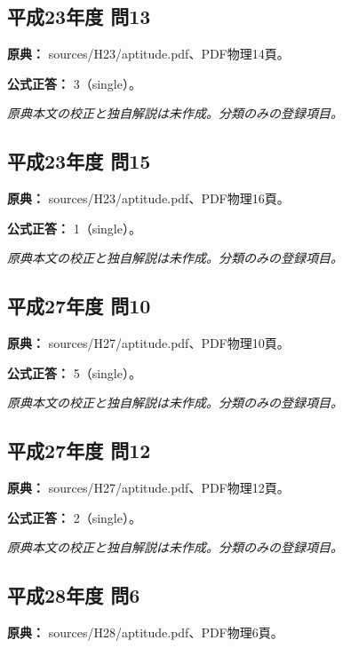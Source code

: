 \subsection{平成23年度 問13}
\label{q:h23-reg-apt-13}

\noindent\textbf{原典：} sources/H23/aptitude.pdf、PDF物理14頁。

\textbf{公式正答：} 3（single）。

\par\textit{原典本文の校正と独自解説は未作成。分類のみの登録項目。}

\subsection{平成23年度 問15}
\label{q:h23-reg-apt-15}

\noindent\textbf{原典：} sources/H23/aptitude.pdf、PDF物理16頁。

\textbf{公式正答：} 1（single）。

\par\textit{原典本文の校正と独自解説は未作成。分類のみの登録項目。}

\subsection{平成27年度 問10}
\label{q:h27-reg-apt-10}

\noindent\textbf{原典：} sources/H27/aptitude.pdf、PDF物理10頁。

\textbf{公式正答：} 5（single）。

\par\textit{原典本文の校正と独自解説は未作成。分類のみの登録項目。}

\subsection{平成27年度 問12}
\label{q:h27-reg-apt-12}

\noindent\textbf{原典：} sources/H27/aptitude.pdf、PDF物理12頁。

\textbf{公式正答：} 2（single）。

\par\textit{原典本文の校正と独自解説は未作成。分類のみの登録項目。}

\subsection{平成28年度 問6}
\label{q:h28-reg-apt-06}

\noindent\textbf{原典：} sources/H28/aptitude.pdf、PDF物理6頁。

